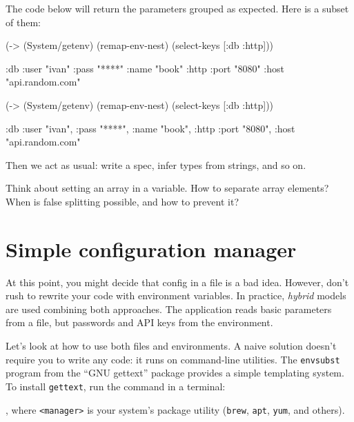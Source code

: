 The code below will return the parameters grouped as expected. Here is a subset of them:

\ifnarrow

\begin{clojure}
(-> (System/getenv)
    (remap-env-nest)
    (select-keys [:db :http]))

{:db {:user "ivan"
      :pass "****"
      :name "book"}
 :http {:port "8080"
        :host "api.random.com"}}
\end{clojure}

\else

\begin{clojure}
(-> (System/getenv)
    (remap-env-nest)
    (select-keys [:db :http]))

{:db {:user "ivan", :pass "****", :name "book"},
 :http {:port "8080", :host "api.random.com"}}
\end{clojure}

\fi

\noindent
Then we act as usual: write a spec, infer types from strings, and so on.

Think about setting an array in a variable. How to separate array elements? When is false splitting possible, and how to prevent it?

\section{Simple configuration manager}


At this point, you might decide that config in a file is a bad idea. However, don't rush to rewrite your code with environment variables. In practice, \emph{hybrid} models are used combining both approaches. The application reads basic parameters from a file, but passwords and API keys from the environment.


Let's look at how to use both files and environments. A naive solution doesn't require you to write any code: it runs on command-line utilities. The \verb|envsubst| program from the ``GNU gettext'' package provides a simple templating system. To install \verb|gettext|, run the command in a terminal:



\noindent
, where \verb|<manager>| is your system's package utility (\verb|brew|, \verb|apt|, \verb|yum|, and others).

